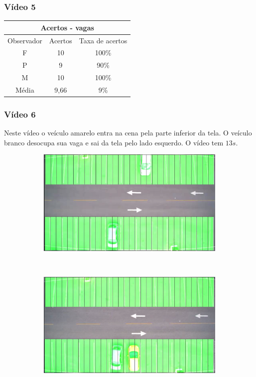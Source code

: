 \documentclass{beamer}
\begin{document}
\begin{frame}
\frametitle{Vídeo 5}
\begin{center}
\begin{tabular}{|c||c||c|}
\hline
\multicolumn{3}{|c|}{Acertos - vagas}  \\ \hline \hline
Observador & Acertos & Taxa de acertos \\ \hline
F & 10 & 100\% \\  \hline
P & 9 & 90\% \\ \hline
M & 10 & 100\% \\ \hline
Média & 9,66 & 9\% \\
\hline
\end{tabular}
\end{center}
\end{frame}

\begin{frame}
\frametitle{Vídeo 6}

Neste vídeo o veículo amarelo entra na cena pela parte inferior da tela. O veículo branco desocupa sua vaga e sai da tela pelo lado esquerdo. O vídeo tem $13s$.

\begin{figure}
\centering
\begin{subfigure}{.5\textwidth}
\centering
\includegraphics[width=.5\linewidth]{Video6Inicio}
\end{subfigure}\
\begin{subfigure}{.5\textwidth}
\centering
\includegraphics[width=.5\linewidth]{Video6Fim}
\end{subfigure}
\centering
\end{figure}	
\end{frame}
\end{document}
